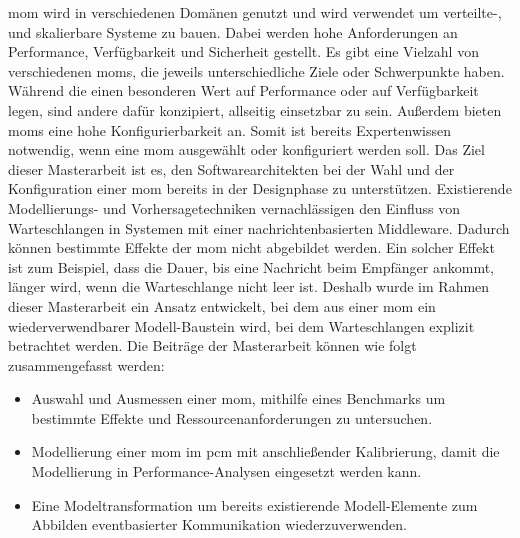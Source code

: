 
\Abstract
\gls{mom} wird in verschiedenen Domänen genutzt und wird verwendet um verteilte-, und skalierbare Systeme zu bauen. Dabei werden hohe Anforderungen an Performance, Verfügbarkeit und Sicherheit gestellt.
Es gibt eine Vielzahl von verschiedenen \gls{mom}s, die jeweils unterschiedliche Ziele oder Schwerpunkte haben. Während die einen besonderen Wert auf Performance oder auf Verfügbarkeit legen, sind andere dafür konzipiert, allseitig einsetzbar zu sein. Außerdem bieten \gls{mom}s eine hohe Konfigurierbarkeit an. Somit ist bereits Expertenwissen notwendig, wenn eine \gls{mom} ausgewählt oder konfiguriert werden soll. Das Ziel dieser Masterarbeit ist es, den Softwarearchitekten bei der Wahl und der Konfiguration einer \gls{mom} bereits in der Designphase zu unterstützen.
Existierende Modellierungs- und Vorhersagetechniken vernachlässigen den Einfluss von Warteschlangen in Systemen mit einer nachrichtenbasierten Middleware. Dadurch können bestimmte Effekte der \gls{mom} nicht abgebildet werden. Ein solcher Effekt ist zum Beispiel, dass die Dauer, bis eine Nachricht beim Empfänger ankommt, länger wird, wenn die Warteschlange nicht leer ist.
Deshalb wurde im Rahmen dieser Masterarbeit ein Ansatz entwickelt, bei dem aus einer \gls{mom} ein wiederverwendbarer Modell-Baustein wird, bei dem Warteschlangen explizit betrachtet werden. Die Beiträge der Masterarbeit können wie folgt zusammengefasst werden:
\begin{itemize}
    \item Auswahl und Ausmessen einer \gls{mom}, mithilfe eines Benchmarks um bestimmte Effekte und Ressourcenanforderungen zu untersuchen.
    \item Modellierung einer \gls{mom} im \gls{pcm} mit anschließender Kalibrierung, damit die Modellierung in Performance-Analysen eingesetzt werden kann.
    \item Eine Modeltransformation um bereits existierende Modell-Elemente zum Abbilden eventbasierter Kommunikation wiederzuverwenden.
\end{itemize}
